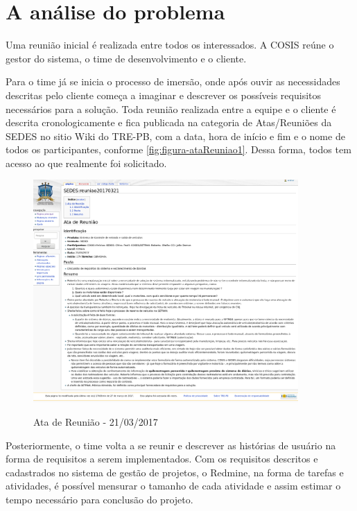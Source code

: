 \section{A análise do problema}
\label{sec:atividadesRealizadasInicio}

Uma reunião inicial é realizada entre todos os interessados. A COSIS reúne o gestor do sistema, o time de desenvolvimento e o cliente. 

Para o time já se inicia o processo de imersão, onde após ouvir as necessidades descritas pelo cliente começa a imaginar e descrever os possíveis requisitos necessários para a solução. 
Toda reunião realizada entre a equipe e o cliente é descrita cronologicamente e fica publicada na categoria de Atas/Reuniões da SEDES no sitio Wiki do TRE-PB, com a data, hora de início e fim e o nome de todos os participantes, conforme \autoref{fig:figura-ataReuniao1}. Dessa forma, todos tem acesso ao que realmente foi solicitado.

\begin{figure}[!htb]
    \centering
    \caption{Ata de Reunião - 21/03/2017}
    \includegraphics[width=0.9\textwidth]{dados/figuras/veiculos-reuniao20170321}
    \label{fig:figura-ataReuniao1}
\end{figure}

Posteriormente, o time volta a se reunir e descrever as histórias de usuário na forma de requisitos a serem implementados. Com os requisitos descritos e cadastrados no sistema de gestão de projetos, o Redmine, na forma de tarefas e atividades, é possível mensurar o tamanho de cada atividade e assim estimar o tempo necessário para conclusão do projeto.  

